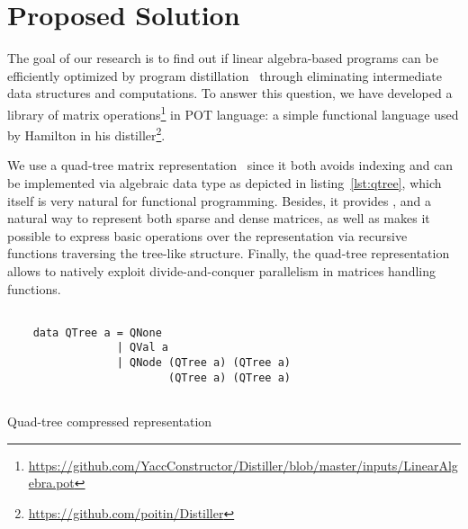 \section{Proposed Solution}

The goal of our research is to find out if linear algebra-based programs can be efficiently optimized by program distillation~\cite{hamilton2021700} through eliminating intermediate data structures and computations.
To answer this question, we have developed a library of matrix operations\footnote{\url{https://github.com/YaccConstructor/Distiller/blob/master/inputs/LinearAlgebra.pot}} in POT language: a simple functional language used by Hamilton in his distiller\footnote{\url{https://github.com/poitin/Distiller}}.  

We use a quad-tree matrix representation~\cite{qtree} since it both avoids indexing and can be implemented via algebraic data type as depicted in listing~\ref{lst:qtree}, which itself is very natural for functional programming.
Besides, it provides , and a natural way to represent both sparse and dense matrices, as well as makes it possible to express basic operations over the representation via recursive functions traversing the tree-like structure.
Finally, the quad-tree representation allows to natively exploit divide-and-conquer parallelism in matrices handling functions.

\begin{listing}

    \begin{verbatim}
  
    data QTree a = QNone  
                 | QVal a 
                 | QNode (QTree a) (QTree a)
                         (QTree a) (QTree a) 
    
    \end{verbatim}
    \caption{Quad-tree compressed representation}
    \label{lst:qtree}
    
    \end{listing}

